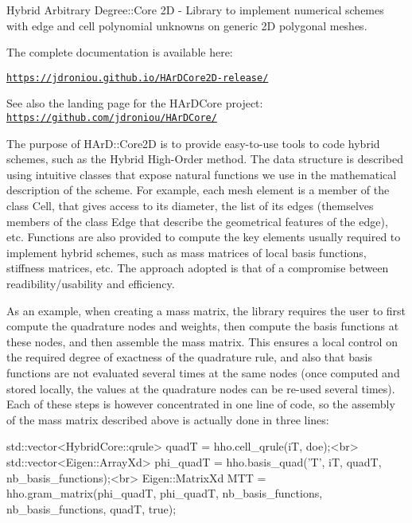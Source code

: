 Hybrid Arbitrary Degree\+::\+Core 2D -\/ Library to implement numerical schemes with edge and cell polynomial unknowns on generic 2D polygonal meshes.

The complete documentation is available here\+:

\href{https://jdroniou.github.io/HArDCore2D-release/}{\tt https\+://jdroniou.\+github.\+io/\+H\+Ar\+D\+Core2\+D-\/release/}

See also the landing page for the H\+Ar\+D\+Core project\+: \href{https://github.com/jdroniou/HArDCore/}{\tt https\+://github.\+com/jdroniou/\+H\+Ar\+D\+Core/}

The purpose of H\+Ar\+D\+::\+Core2D is to provide easy-\/to-\/use tools to code hybrid schemes, such as the Hybrid High-\/\+Order method. The data structure is described using intuitive classes that expose natural functions we use in the mathematical description of the scheme. For example, each mesh element is a member of the class \textquotesingle{}Cell\textquotesingle{}, that gives access to its diameter, the list of its edges (themselves members of the class \textquotesingle{}Edge\textquotesingle{} that describe the geometrical features of the edge), etc. Functions are also provided to compute the key elements usually required to implement hybrid schemes, such as mass matrices of local basis functions, stiffness matrices, etc. The approach adopted is that of a compromise between readibility/usability and efficiency.

As an example, when creating a mass matrix, the library requires the user to first compute the quadrature nodes and weights, then compute the basis functions at these nodes, and then assemble the mass matrix. This ensures a local control on the required degree of exactness of the quadrature rule, and also that basis functions are not evaluated several times at the same nodes (once computed and stored locally, the values at the quadrature nodes can be re-\/used several times). Each of these steps is however concentrated in one line of code, so the assembly of the mass matrix described above is actually done in three lines\+:


\begin{DoxyCode}
std::vector<HybridCore::qrule> quadT = hho.cell\_qrule(iT, doe);<br>
std::vector<Eigen::ArrayXd> phi\_quadT = hho.basis\_quad('T', iT, quadT, nb\_basis\_functions);<br>
Eigen::MatrixXd MTT = hho.gram\_matrix(phi\_quadT, phi\_quadT, nb\_basis\_functions, nb\_basis\_functions, quadT,
       true);
\end{DoxyCode}


